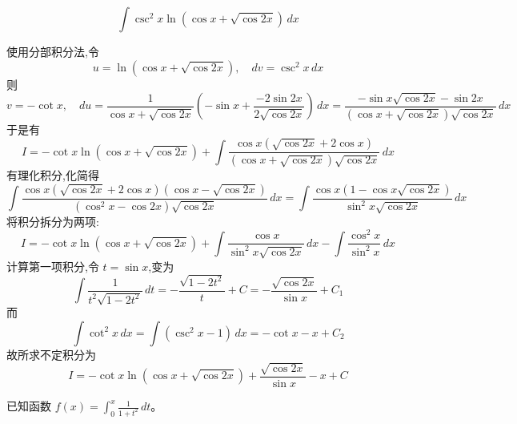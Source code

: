 \begin{questions}
    \question
    \[
    \int \csc^2 x \ln(\cos x + \sqrt{\cos 2x}) \, dx
    \]
    \begin{solution}
        使用分部积分法,令
        \[
        u = \ln(\cos x + \sqrt{\cos 2x}), \quad dv = \csc^2 x \, dx
        \]
        则
        \[
        v = -\cot x,\quad du = \frac{1}{\cos x + \sqrt{\cos 2x}} \left( -\sin x + \frac{-2\sin 2x}{2\sqrt{\cos 2x}} \right) \, dx = \frac{-\sin x \sqrt{\cos 2x} - \sin 2x}{(\cos x + \sqrt{\cos 2x})\sqrt{\cos 2x}} \, dx
        \]
        于是有
        \[
        I = -\cot x \ln(\cos x + \sqrt{\cos 2x}) + \int \frac{\cos x (\sqrt{\cos 2x} + 2\cos x)}{(\cos x + \sqrt{\cos 2x})\sqrt{\cos 2x}} \, dx
        \]
        有理化积分,化简得
        \[
        \int \frac{\cos x (\sqrt{\cos 2x} + 2\cos x)(\cos x - \sqrt{\cos 2x})}{(\cos^2 x - \cos 2x)\sqrt{\cos 2x}} \, dx
        = \int \frac{\cos x (1 - \cos x \sqrt{\cos 2x})}{\sin^2 x \sqrt{\cos 2x}} \, dx
        \]
        将积分拆分为两项:
        \[
        I = -\cot x \ln(\cos x + \sqrt{\cos 2x}) + \int \frac{\cos x}{\sin^2 x \sqrt{\cos 2x}} \, dx - \int \frac{\cos^2 x}{\sin^2 x} \, dx
        \]
        计算第一项积分,令 $t = \sin x$,变为
        \[
        \int \frac{1}{t^2 \sqrt{1-2t^2}} \, dt = -\frac{\sqrt{1-2t^2}}{t} + C = -\frac{\sqrt{\cos 2x}}{\sin x} + C_1
        \]
        而
        \[
        \int \cot^2 x \, dx = \int (\csc^2 x - 1) \, dx = -\cot x - x + C_2
        \]
        故所求不定积分为
        \[
        I = -\cot x \ln(\cos x + \sqrt{\cos 2x}) + \frac{\sqrt{\cos 2x}}{\sin x} - x + C
        \]
    \end{solution}

    \question
已知函数 $f(x) = \int_0^x \frac{1}{1 + t^2} \, dt$。
\end{questions}
